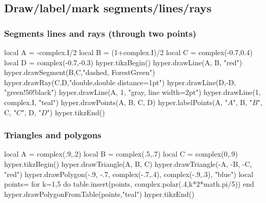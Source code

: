 \documentclass{article}
\begin{document}
\subsection{Draw/label/mark  segments/lines/rays}

\subsubsection{Segments lines and rays (through two points)}
\begin{codeandresult}
\begin{luacode*}
local A = -complex.I/2
local B = (1+complex.I)/2
local C = complex(-0.7,0.4)
local D = complex(-0.7,-0.3)
hyper.tikzBegin()
hyper.drawLine(A, B, "red")
hyper.drawSegment(B,C,"dashed, ForestGreen")
hyper.drawRay(C,D,"double,double distance=1pt")
hyper.drawLine(D,-D, "green!50!black")
hyper.drawLine(A, 1, "gray, line width=2pt")
hyper.drawLine(1, complex.I, "teal")
hyper.drawPoints(A, B, C, D)
hyper.labelPoints(A, "$A$", B, "$B$", C, "$C$", D, "$D$")
hyper.tikzEnd()
\end{luacode*}
\end{codeandresult}



\subsubsection{Triangles and polygons}
\begin{codeandresult}
\begin{luacode*}
local A = complex(.9,.2)
local B = complex(.5,.7)
local C = complex(0,.9)
hyper.tikzBegin()
hyper.drawTriangle(A, B, C)
hyper.drawTriangle(-A, -B, -C, "red")
hyper.drawPolygon(-.9, -.7, complex(-.7,.4), complex(-.9,.3), "blue")
local points={}
for k=1,5 do
	table.insert(points, complex.polar(.4,k*2*math.pi/5))
end
hyper.drawPolygonFromTable(points,"teal")
hyper.tikzEnd()
\end{luacode*}
\end{codeandresult}
\end{document}
